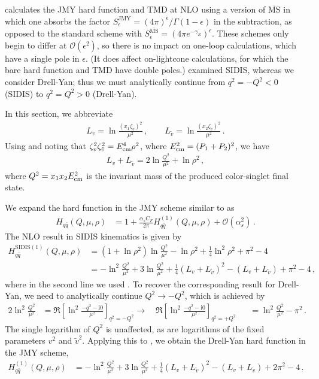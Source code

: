 \documentclass[11pt,a4paper]{article}
\newcommand{\MSbar}{{\overline{\mathrm{MS}}}}
\newcommand{\img}{\mathrm{i}}
\newcommand{\eps}{\epsilon}
\newcommand{\cO}{\mathcal{O}}
\newcommand{\nn}{\nonumber}
\newcommand{\bq}{{\bar{q}}}
\newcommand{\as}{\alpha_s}
\newcommand{\tv}{{\tilde v}}
\newcommand{\Ecm}{E_{\rm cm}}
\newcommand{\SIDIS}{\mathrm{SIDIS}}
\newcommand{\JMY}{\mathrm{JMY}}
\begin{document}
 calculates
the JMY hard function and TMD at NLO
using a version of $\MSbar$ in which one absorbs the factor
$S_\eps^\JMY = (4\pi)^\eps / \Gamma(1-\eps)$ in the subtraction, as opposed to the standard
scheme with $S_\eps^{\MSbar} = (4\pi e^{-\gamma_E})^\eps$.
These schemes only begin to differ at $\cO(\eps^2)$, so there is no impact on one-loop
calculations, which have a single pole in $\eps$. (It does affect on-lightcone calculations,
for which the bare hard function and TMD have double poles.)
 examined SIDIS, whereas we consider Drell-Yan;
thus we must analytically continue from $q^2 = -Q^2 < 0$ (SIDIS) to $q^2 = Q^2 > 0$ (Drell-Yan).

In this section, we abbreviate
\begin{align} \label{eq:app:def_Lv}
 L_v = \ln\frac{(x_1 \zeta_v)^2}{\mu^2}
 \,,\qquad
 L_\tv = \ln\frac{(x_2 \zeta_\tv)^2}{\mu^2}
\,.\end{align}
Using  and noting that $\zeta_v^2 \zeta_{\tv}^2 = \Ecm^4 \rho^2$,
where $\Ecm^2 = (P_1 + P_2)^2$, we have
\begin{align} \label{eq:app:relation_logs}
  L_v + L_\tv = 2 \ln \frac{Q^2}{\mu^2} + \ln\rho^2
\,,\end{align}
where $Q^2 = x_1 x_2 \Ecm^2$ is the invariant mass of the produced color-singlet final state.

We expand the hard function in the JMY scheme similar to  as
\begin{align}
 H_{q \bq}(Q, \mu, \rho) &
 = 1 + \frac{\as C_F}{2\pi} H_{q \bq}^{(1)}(Q, \mu, \rho) + \cO(\as^2)
\,.\end{align}
The NLO result in SIDIS kinematics is given by~\cite{Ji:2004wu}
\begin{align} \label{eq:app:hard_JMY_nlo_SIDIS}
 H_{q \bq}^{\SIDIS(1)}(Q, \mu, \rho) &
 = (1 + \ln\rho^2) \ln\frac{Q^2}{\mu^2} - \ln\rho^2 + \frac14 \ln^2\rho^2 + \pi^2 - 4
 \nn\\&
 = - \ln^2\frac{Q^2}{\mu^2} + 3 \ln\frac{Q^2}{\mu^2}
   + \frac14 (L_v + L_\tv)^2 - (L_v + L_\tv)
   + \pi^2 - 4
\,,\end{align}
where in the second line we used .
To recover the corresponding result for Drell-Yan, we need to analytically continue $Q^2 \to -Q^2$,
which is achieved by
\begin{alignat}{2} \label{eq:app:timelike_log_replacement}
 \ln^2\frac{Q^2}{\mu^2} &
 = \Re\left[\ln^2\frac{-q^2 - \img0}{\mu^2} \right]_{q^2 = -Q^2}
 \to\quad
 \Re\left[\ln^2\frac{-q^2 - \img0}{\mu^2} \right]_{q^2 = +Q^2}
 &&= \ln^2\frac{Q^2}{\mu^2} - \pi^2
\,.\end{alignat}
The single logarithm of $Q^2$ is unaffected, as are logarithms of the fixed parameters $v^2$ and $\tv^2$.
Applying this to , we obtain the Drell-Yan hard function in the JMY scheme,
\begin{align} \label{eq:app:hard_JMY_Dy_nlo}
 H_{q \bar q}^{(1)}(Q, \mu, \rho) &
 = - \ln^2\frac{Q^2}{\mu^2} + 3 \ln\frac{Q^2}{\mu^2}
   + \frac14 (L_v + L_\tv)^2 - (L_v + L_\tv)
   + 2 \pi^2 - 4
\,.\end{align}
\end{document}
